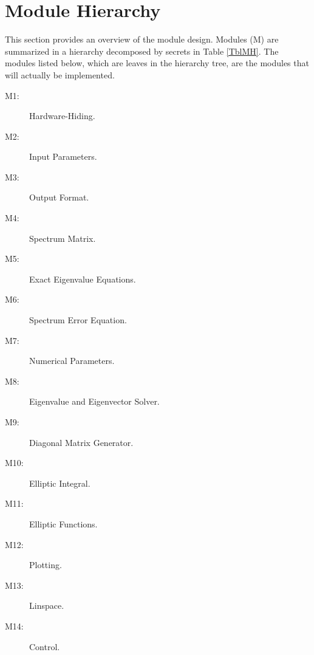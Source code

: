 \documentclass[12pt, titlepage]{article}
\begin{document}
\newpage 
\section{Module Hierarchy} \label{SecMH}

This section provides an overview of the module design. Modules (M) are 
summarized
in a hierarchy decomposed by secrets in Table \ref{TblMH}. The modules listed
below, which are leaves in the hierarchy tree, are the modules that will
actually be implemented.
\begin{description}
\item[M1:] Hardware-Hiding.\\
\item[M2:] Input Parameters.\\
\item[M3:] Output Format.\\
\item[M4:] Spectrum Matrix.\\
\item[M5:] Exact Eigenvalue Equations.\\ 
\item[M6:] Spectrum Error Equation.\\
\item[M7:] Numerical Parameters. \\
\item[M8:] Eigenvalue and Eigenvector Solver. \\
\item[M9:] Diagonal Matrix Generator.\\ 
\item[M10:] Elliptic Integral. \\
\item[M11:] Elliptic Functions. \\
\item[M12:] Plotting. \\ 
\item[M13:] Linspace. \\ 
\item[M14:] Control. \\
\end{description}
\end{document}
